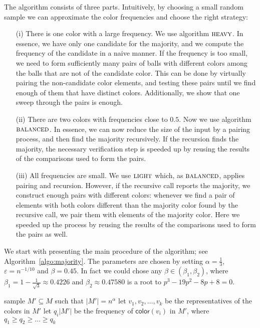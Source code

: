 \documentclass{article}[11pt,a4paper]
\newcommand{\ballcolor}{\mathsf{color}}
\begin{document}
The algorithm consists of three parts. Intuitively, by choosing a small random sample
we can approximate the color frequencies and choose the right strategy:
\begin{enumerate}
\item[(i)] There is one color with a large
frequency. We use algorithm $\textsc{heavy}$. In essence, we have only one candidate for the majority, and
we compute the frequency of the candidate in a naive manner. If the frequency is too small, we need to form sufficiently many pairs of balls with different colors among the balls that are not of the candidate color. This can be done by virtually pairing the non-candidate color elements, and testing these pairs until we find enough of them that have distinct colors. Additionally, we show that one sweep through the pairs is enough.
\item[(ii)] There are two colors with frequencies close to $0.5$. Now we use algorithm $\textsc{balanced}$. In essence, we can now reduce the size of the input by a pairing process, and then find the majority recursively.
If the recursion finds the majority, the necessary verification step is speeded up by reusing the results of the comparisons used to form the pairs.
\item[(iii)] All frequencies are small. We use $\textsc{light}$ which, as $\textsc{balanced}$, applies pairing and recursion. However, if the recursive call reports the majority, we construct enough pairs with different colors: whenever we find a pair of elements with both colors different than the majority color found by the recursive call, we pair them with elements of the majority color. Here we speeded up the process by reusing the results of the comparisons used to form the pairs as well.
\end{enumerate}

We start with presenting the main procedure of the algorithm; see Algorithm~\ref{algo:majority}.
The parameters are chosen by setting $\alpha = \frac13$, $\varepsilon = n^{-1/10}$ and $\beta = 0.45$. In fact we could chose any $\beta \in (\beta_1,\beta_2)$, where $\beta_1 = 1-\frac1{\sqrt{3}} \approx 0.4226$ and $\beta_2 \approx 0.47580$ is a root to $p^3-19 p^2-8 p + 8 = 0$.

\begin{algorithm}
\caption{$\textsc{majority}(M)$\label{algo:majority}}
sample $M' \subseteq M$ such that $|M'| = n^{\alpha}$\;
let $v_1,v_2,\ldots,v_k$ be the representatives of the colors in $M'$\;
let $q_i |M'|$ be the frequency of $\ballcolor(v_i)$ in $M'$, where $q_1 \ge q_2 \ge \ldots \ge q_k$\label{line:sampling}\;
\end{algorithm}
\end{document}
